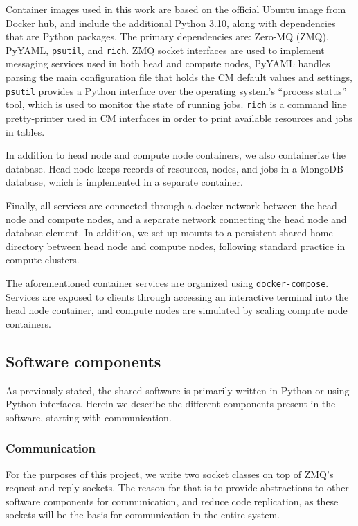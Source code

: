 \documentclass[sigconf]{acmart}
\begin{document}
Container images used in this work are based on the official Ubuntu image from Docker hub, and include the additional Python
3.10, along with dependencies that are Python packages.
The primary dependencies are: Zero-MQ (ZMQ), PyYAML, \verb|psutil|, and \verb|rich|.
ZMQ socket interfaces are used to implement messaging services used in both head and compute nodes,
PyYAML handles parsing the main configuration file that holds the CM default values and settings,
\verb|psutil| provides a Python interface over the operating system's ``process status'' tool, which is used to monitor the 
state of running jobs.
\verb|rich| is a command line pretty-printer used in CM interfaces in order to print available resources and jobs in tables.

In addition to head node and compute node containers, we also containerize the database. 
Head node keeps records of resources, nodes, and jobs in a MongoDB database, which is implemented in a separate container.

Finally, all services are connected through a docker network between the head node and compute nodes, and a separate network
connecting the head node and database element.
In addition, we set up mounts to a persistent shared home directory between head node and compute nodes, following standard
practice in compute clusters.

The aforementioned container services are organized using \verb|docker-compose|.
Services are exposed to clients through accessing an interactive terminal into the head node container, and compute nodes are
simulated by scaling compute node containers.

\subsection{Software components}

As previously stated, the shared software is primarily written in Python or using Python interfaces.
Herein we describe the different components present in the software, starting with communication.

\subsubsection{Communication}
For the purposes of this project, we write two socket classes on top of ZMQ's request and reply sockets.
The reason for that is to provide abstractions to other software components for communication, and reduce code replication, as
these sockets will be the basis for communication in the entire system.
\end{document}
